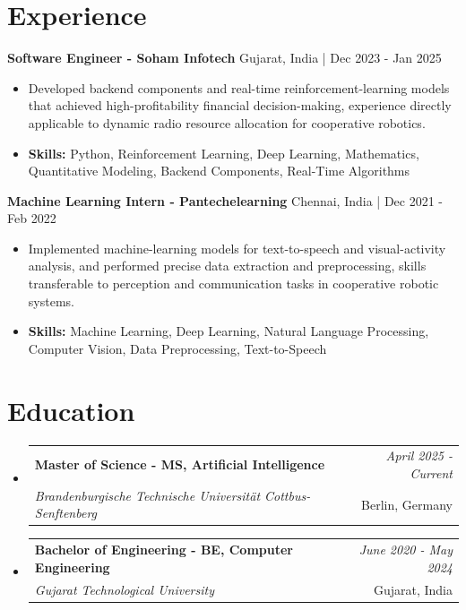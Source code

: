 \documentclass[a4paper,11pt]{article}
\makeatletter
\newcommand{\resumeSubheading}[4]{
\vspace{0.5mm}\item
    \begin{tabular*}{\linewidth}[t]{l@{\extracolsep{\fill}}r}
        \textbf{#1} & \textit{\footnotesize{#4}} \\
        \textit{\footnotesize{#3}} &  \footnotesize{#2}\\
    \end{tabular*}
    \vspace{-2.4mm}
}
\makeatother
\begin{document}
\section{\textbf{Experience}}


\vspace{1mm}
  \textbf{Software Engineer - Soham Infotech} \hfill Gujarat, India | Dec 2023 - Jan 2025
\vspace{-1.5mm} %
\begin{itemize}
  \item Developed backend components and real-time reinforcement-learning models that achieved high-profitability financial decision-making, experience directly applicable to dynamic radio resource allocation for cooperative robotics.

\vspace{-2mm}
  \item \textbf{Skills:} Python, Reinforcement Learning, Deep Learning, Mathematics, Quantitative Modeling, Backend Components, Real-Time Algorithms
\end{itemize}

\vspace{1mm}
  \textbf{Machine Learning Intern - Pantechelearning} \hfill Chennai, India | Dec 2021 - Feb 2022
\vspace{-1.5mm} %
\begin{itemize}
  \item Implemented machine-learning models for text-to-speech and visual-activity analysis, and performed precise data extraction and preprocessing, skills transferable to perception and communication tasks in cooperative robotic systems.
\vspace{-2mm}
  \item \textbf{Skills:} Machine Learning, Deep Learning, Natural Language Processing, Computer Vision, Data Preprocessing, Text-to-Speech
\end{itemize}\section{\textbf{Education}}
\vspace{-0.4mm}

\begin{itemize}[leftmargin=0.15in, label={}]
\resumeSubheading
{Master of Science - MS, Artificial Intelligence }{Berlin, Germany}
{Brandenburgische Technische Universität Cottbus-Senftenberg  }{April 2025 - Current}

\vspace{1.0mm} %
\resumeSubheading
{Bachelor of Engineering - BE, Computer Engineering  }{Gujarat, India}
{Gujarat Technological University }{June 2020 - May 2024}

\end{itemize}
\end{document}
